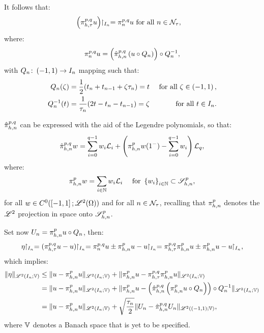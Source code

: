 It follows that:
\begin{align}
    \left( \pi_{h, \tau}^{p, q} u \right) \!\!\restriction_{I_n} = \pi^{p, q}_n u &\text{ for all } n \in \mathcal{N}_{\tau},
\end{align}
where:
\begin{align}
    \pi^{p, q}_n u = \left( \hat{\pi}_{h, n}^{p, q} \left( u \circ Q_n \right) \right) \circ Q_n^{-1},
\end{align}
with $Q_n \colon \left( -1, 1 \right) \rightarrow I_n$ mapping such that:
\begin{align}
    Q_n(\zeta) &= \frac{1}{2}(t_n + t_{n - 1} + \zeta \tau_n) = t &\text{ for all } \zeta \in \left( -1, 1 \right), \\
    Q_n^{-1}(t) &= \frac{1}{\tau_n}(2t - t_n - t_{n - 1}) = \zeta &\text{ for all } t \in I_n.
\end{align}

\begin{lemma} \label{lemma:legendre_interpolant}
    $\hat{\pi}_{h, n}^{p, q}$ can be expressed with the aid of the Legendre polynomials, so that:
    \begin{align}
        \hat{\pi}_{h, n}^{p, q} w = \sum_{i = 0}^{q - 1} w_i \mathcal{L}_i + \left( \pi_{h, n}^p w(1^-) - \sum_{i = 0}^{q - 1} w_i \right) \mathcal{L}_q,
    \end{align}
    where:
    \begin{align}
        \pi_{h, n}^p w &= \sum_{i \in \mathbb{N}} w_i \mathcal{L}_i &\text{ for } \left\{ w_i \right\}_{i \in \mathbb{N}} \subset \mathscr{S}^p_{h, n},
    \end{align}
    for all $w \in C^0(\left[ -1, 1 \right]; \mathscr{L}^{2}(\Omega))$ and for all $n \in \mathcal{N}_{\tau}$, recalling that $\pi_{h, n}^p$ denotes the $\mathscr{L}^{2}$ projection in space onto $\mathscr{S}^p_{h, n}$.
\end{lemma}

Set now $U_n = \pi_{h, n}^p u \circ Q_n$, then:
\begin{align}
    \eta \Restriction_{I_n} = (\InterpolantPQ u - u) \Restriction_{ I_n} = \InterpolantPQI u \pm \InterSol u - u \Restriction_{I_n} = \InterpolantPQ \InterSol u \pm \InterSol u - u \Restriction_{I_n},
\end{align}
which implies:
\begin{align}
    \lVert \eta \rVert_{\mathscr{L}^{2}(I_n; \mathbb{V})} & \leq \lVert u - \pi_{h, n}^p u \rVert_{\mathscr{L}^{2}(I_n; \mathbb{V})} + \lVert \pi_{h, n}^p u - \pi_{h, \tau}^{p, q} \pi_{h, n}^p u \rVert_{\mathscr{L}^{2}(I_n; \mathbb{V})} \notag \\
    &= \lVert u - \pi_{h, n}^p u \rVert_{\mathscr{L}^{2}(I_n; \mathbb{V})} + \lVert \pi_{h, n}^p u - \left( \hat{\pi}_{h, n}^{p, q} \left( \pi_{h, n}^p u \circ Q_n \right) \right) \circ Q_n^{-1} \rVert_{\mathscr{L}^{2}(I_n; \mathbb{V})} \notag \\
    &= \lVert u - \pi_{h, n}^p u \rVert_{\mathscr{L}^{2}(I_n; \mathbb{V})} + \sqrt{\frac{\tau_n}{2}} \lVert U_n - \hat{\pi}_{h, n}^{p, q} U_n \rVert_{\mathscr{L}^{2}(\left( -1, 1 \right); \mathbb{V})},
\end{align}
where $\mathbb{V}$ denotes a Banach space that is yet to be specified.

